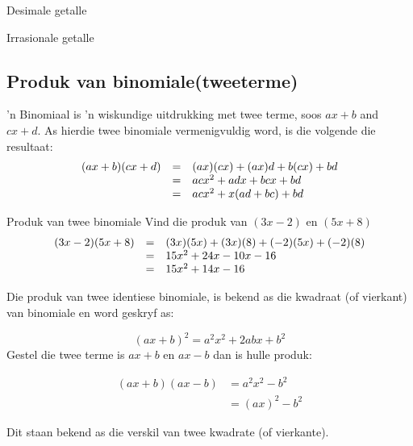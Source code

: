 \begin{Aktiwiteit}{Desimale getalle}
\begin{aktiwiteit}{Irrasionale getalle}
\subsection*{Produk van binomiale(tweeterme)}

’n Binomiaal is ’n wiskundige uitdrukking met twee terme, soos $ax+b$ and $cx+d$. As hierdie twee binomiale
vermenigvuldig word, is die volgende die resultaat:
\begin{equation*}
\begin{array}{ccc}\hfill (ax+b)(cx+d) & =& (ax)(cx)+(ax)d+b(cx)+bd\hfill  \\
& =& ac{x}^{2}+adx +bcx+bd\hfill\\
& =& ac{x}^{2}+x(ad+bc)+bd\hfill \end{array}
\end{equation*}

\par

\begin{wex}{Produk van twee binomiale }
{Vind die produk van $(3x-2)$ en $(5x+8)$ }{
\begin{equation*}
\begin{array}{ccl}\hfill (3x-2)(5x+8)& =& (3x)(5x)+(3x)(8)+(-2)(5x)+(-2)(8)\hfill \\
 & =& 15{x}^{2}+24x-10x-16\hfill \\
 & =& 15{x}^{2}+14x-16\hfill 
\end{array}
\end{equation*}
} 
\end{wex}




Die produk van twee identiese binomiale, is bekend as die kwadraat (of vierkant) van binomiale en word geskryf
as:

\begin{equation*}
{(ax+b)}^{2}={a}^{2}{x}^{2}+2abx+{b}^{2}
\end{equation*}
Gestel die twee terme is $ax+b$ en $ax-b$ dan is hulle produk:\par 

\begin{align*}
(ax+b)(ax-b) &={a}^{2}{x}^{2}-{b}^{2} \\ &= (ax)^2-b^2
\end{align*}

Dit staan bekend as die verskil van twee kwadrate (of vierkante).\par 



\end{aktiwiteit}
\end{Aktiwiteit}
